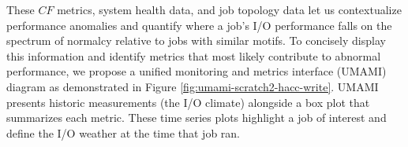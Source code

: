 These $\mathit{CF}$ metrics, system health data, and job topology data let us contextualize performance anomalies and quantify where a job's I/O performance falls on the spectrum of normalcy relative to jobs with similar motifs.
To concisely display this information and identify metrics that most likely contribute to abnormal performance, we propose a unified monitoring and metrics interface (UMAMI) diagram as demonstrated in Figure \ref{fig:umami-scratch2-hacc-write}.
UMAMI presents historic measurements (the I/O climate) alongside a box plot that summarizes each metric.
These time series plots highlight a job of interest and define the I/O weather at the time that job ran.

